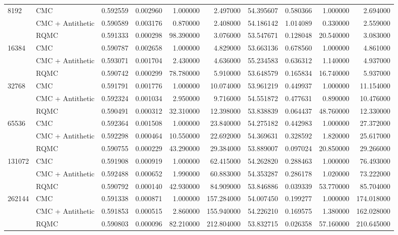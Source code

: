 \begin{tabular}{llrrrrrrrr}
\cline{1-10}
\multirow[t]{3}{*}{8192} & CMC & 0.592559 & 0.002960 & 1.000000 & 2.497000 & 54.395607 & 0.580366 & 1.000000 & 2.694000 \\
 & CMC + Antithetic & 0.590589 & 0.003176 & 0.870000 & 2.408000 & 54.186142 & 1.014089 & 0.330000 & 2.559000 \\
 & RQMC & 0.591333 & 0.000298 & 98.390000 & 3.076000 & 53.547671 & 0.128048 & 20.540000 & 3.083000 \\
\cline{1-10}
\multirow[t]{3}{*}{16384} & CMC & 0.590787 & 0.002658 & 1.000000 & 4.829000 & 53.663136 & 0.678560 & 1.000000 & 4.861000 \\
 & CMC + Antithetic & 0.593071 & 0.001704 & 2.430000 & 4.636000 & 55.234583 & 0.636312 & 1.140000 & 4.937000 \\
 & RQMC & 0.590742 & 0.000299 & 78.780000 & 5.910000 & 53.648579 & 0.165834 & 16.740000 & 5.937000 \\
\cline{1-10}
\multirow[t]{3}{*}{32768} & CMC & 0.591791 & 0.001776 & 1.000000 & 10.074000 & 53.961219 & 0.449937 & 1.000000 & 11.154000 \\
 & CMC + Antithetic & 0.592324 & 0.001034 & 2.950000 & 9.716000 & 54.551872 & 0.477631 & 0.890000 & 10.476000 \\
 & RQMC & 0.590491 & 0.000312 & 32.310000 & 12.398000 & 53.838839 & 0.064437 & 48.760000 & 12.330000 \\
\cline{1-10}
\multirow[t]{3}{*}{65536} & CMC & 0.592364 & 0.001508 & 1.000000 & 23.840000 & 54.275182 & 0.442983 & 1.000000 & 27.372000 \\
 & CMC + Antithetic & 0.592298 & 0.000464 & 10.550000 & 22.692000 & 54.369631 & 0.328592 & 1.820000 & 25.617000 \\
 & RQMC & 0.590755 & 0.000229 & 43.290000 & 29.384000 & 53.889007 & 0.097024 & 20.850000 & 29.266000 \\
\cline{1-10}
\multirow[t]{3}{*}{131072} & CMC & 0.591908 & 0.000919 & 1.000000 & 62.415000 & 54.262820 & 0.288463 & 1.000000 & 76.493000 \\
 & CMC + Antithetic & 0.592488 & 0.000652 & 1.990000 & 60.883000 & 54.353287 & 0.286178 & 1.020000 & 73.222000 \\
 & RQMC & 0.590792 & 0.000140 & 42.930000 & 84.909000 & 53.846886 & 0.039339 & 53.770000 & 85.704000 \\
\cline{1-10}
\multirow[t]{3}{*}{262144} & CMC & 0.591338 & 0.000871 & 1.000000 & 157.284000 & 54.007450 & 0.199277 & 1.000000 & 174.018000 \\
 & CMC + Antithetic & 0.591853 & 0.000515 & 2.860000 & 155.940000 & 54.226210 & 0.169575 & 1.380000 & 162.028000 \\
 & RQMC & 0.590803 & 0.000096 & 82.210000 & 212.804000 & 53.832715 & 0.026358 & 57.160000 & 210.645000 \\
\cline{1-10}
\bottomrule
\end{tabular}
